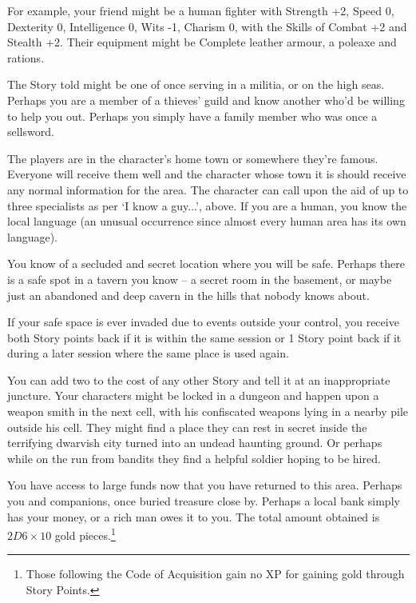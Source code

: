 \documentclass[titlepage,a4paper,openany]{book}
\begin{document}
\begin{multicols}{2}
For example, your friend might be a human fighter with Strength +2, Speed 0, Dexterity 0, Intelligence 0, Wits -1, Charism 0, with the Skills of Combat +2 and Stealth +2. Their equipment might be Complete leather armour, a poleaxe and rations.

The Story told might be one of once serving in a militia, or on the high seas. Perhaps you are a member of a thieves' guild and know another who'd be willing to help you out. Perhaps you simply have a family member who was once a sellsword.

The players are in the character's home town or somewhere they're famous. Everyone will receive them well and the character whose town it is should receive any normal information for the area. The character can call upon the aid of up to three specialists as per `I know a guy...', above. If you are a human, you know the local language (an unusual occurrence since almost every human area has its own language).

You know of a secluded and secret location where you will be safe. Perhaps there is a safe spot in a tavern you know -- a secret room in the basement, or maybe just an abandoned and deep cavern in the hills that nobody knows about.

If your safe space is ever invaded due to events outside your control, you receive both Story points back if it is within the same session or 1 Story point back if it during a later session where the same place is used again.

You can add two to the cost of any other Story and tell it at an inappropriate juncture. Your characters might be locked in a dungeon and happen upon a weapon smith in the next cell, with his confiscated weapons lying in a nearby pile outside his cell. They might find a place they can rest in secret inside the terrifying dwarvish city turned into an undead haunting ground. Or perhaps while on the run from bandits they find a helpful soldier hoping to be hired.

You have access to large funds now that you have returned to this area. Perhaps you and companions, once buried treasure close by. Perhaps a local bank simply has your money, or a rich man owes it to you. The total amount obtained is $2D6 \times 10$ gold pieces.\footnote{Those following the Code of Acquisition gain no XP for gaining gold through Story Points.}


\end{multicols}
\end{document}

